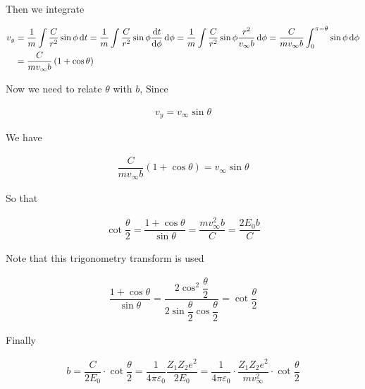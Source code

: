 Then we integrate

\begin{equation*}
  \begin{aligned}
    v_y &= \dfrac{1}{m} \int \dfrac{C}{r^2} \sin \phi \mathop{}\!\mathrm{d} t
    = \dfrac{1}{m} \int \dfrac{C}{r^2} \sin \phi \dfrac{\mathop{}\!\mathrm{d} t}{\mathop{}\!\mathrm{d} \phi} \mathop{}\!\mathrm{d} \phi 
    = \dfrac{1}{m} \int \dfrac{C}{r^2} \sin \phi \dfrac{r^2}{v_{\infty} b}  \mathop{}\!\mathrm{d} \phi
    = \dfrac{C}{m v_{\infty} b} \int_0^{\pi - \theta} \sin \phi \mathop{}\!\mathrm{d} \phi\\
    &= \dfrac{C}{m v_{\infty} b} \left( 1 + \cos \theta \right) 
  \end{aligned}
\end{equation*}

Now we need to relate $\theta$ with $b$, Since

\begin{equation*}
  \begin{aligned}
    v_y = v_\infty \sin \theta
  \end{aligned}
\end{equation*}

We have

\begin{equation*}
  \begin{aligned}
    \dfrac{C}{m v_{\infty} b} \left( 1 + \cos \theta \right) = v_{\infty} \sin \theta
  \end{aligned}
\end{equation*}

So that

\begin{equation*}
  \begin{aligned}
    \cot \dfrac{\theta}{2} = \dfrac{1 + \cos \theta}{\sin \theta} = \dfrac{m v_{\infty}^2 b}{C} = \dfrac{2 E_0 b}{C} 
  \end{aligned}
\end{equation*}

Note that this trigonometry transform is used

\begin{equation*}
  \begin{aligned}
    \dfrac{1 + \cos \theta}{\sin \theta} = \dfrac{2 \cos^2 \dfrac{\theta}{2}}{2 \sin \dfrac{\theta}{2} \cos \dfrac{\theta}{2}} = \cot \dfrac{\theta}{2}
  \end{aligned}
\end{equation*}

Finally

\begin{equation*}
  \begin{aligned}
    b = \dfrac{C}{2 E_0} \cdot \cot \dfrac{\theta}{2} = \dfrac{1}{4 \pi \varepsilon_0} \dfrac{Z_1 Z_2 e^2}{2 E_0} = \dfrac{1}{4 \pi \varepsilon_0} \cdot \dfrac{Z_1 Z_2 e^2}{m v_{\infty}^2} \cdot \cot \dfrac{\theta}{2} 
  \end{aligned}
\end{equation*}

